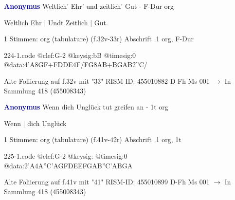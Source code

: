 \documentclass[twocolumn]{book}
\begin{document}
\newline \par \vspace{7pt} \textcolor{darkblue}{\textbf{Anonymus  }}
\newline Weltlich' Ehr' und zeitlich' Gut - F-Dur
\newline org
\newline \begin{itshape}[f.32v, at left:] Weltlich Ehr | Undt Zeitlich | Gut.\end{itshape} 
\newline \textcolor{darkblue}{}  1 Stimmen: org (tabulature)  (f.32v-33r)
\newline Abschrift
.1  org, F-Dur  
\begin{filecontents*}{224-1.code}
@clef:G-2
@keysig:bB
@timesig:0
@data:4'A{8GF+}{FDDE}4F/FG{8AB+}{BGAB}2''C/
\end{filecontents*}
\newline
%
\newline Alte Foliierung auf f.32v mit "33"
\newline RISM-ID: 455010882
\newline D-Fh  Ms 001
\newline $\rightarrow$ In Sammlung 418 (455008343)
      
\newline \par \vspace{7pt} \textcolor{darkblue}{\textbf{Anonymus  }}
\newline Wenn dich Unglück tut greifen an - 1t
\newline org
\newline \begin{itshape}[f.41v, at left:] Wenn | dich Unglück\end{itshape} 
\newline \textcolor{darkblue}{}  1 Stimmen: org (tabulature)  (f.41v-42r)
\newline Abschrift
.1  org, 1t  
\begin{filecontents*}{225-1.code}
@clef:G-2
@keysig:
@timesig:0
@data:2'A4A''C'AGFDEEFGAB''C'ABGA
\end{filecontents*}
\newline
%
\newline Alte Foliierung auf f.41v mit "41"
\newline RISM-ID: 455010899
\newline D-Fh  Ms 001
\newline $\rightarrow$ In Sammlung 418 (455008343)
      
\end{document}
